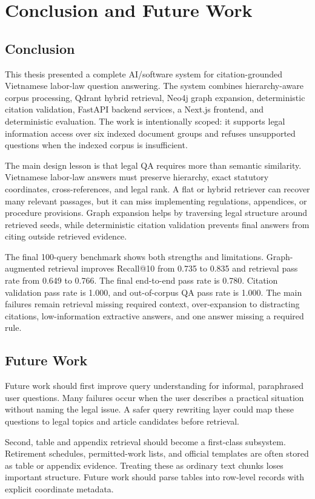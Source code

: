 \section{Conclusion and Future Work}

\subsection{Conclusion}
This thesis presented a complete AI/software system for citation-grounded Vietnamese labor-law question answering. The system combines hierarchy-aware corpus processing, Qdrant hybrid retrieval, Neo4j graph expansion, deterministic citation validation, FastAPI backend services, a Next.js frontend, and deterministic evaluation. The work is intentionally scoped: it supports legal information access over six indexed document groups and refuses unsupported questions when the indexed corpus is insufficient.

The main design lesson is that legal QA requires more than semantic similarity. Vietnamese labor-law answers must preserve hierarchy, exact statutory coordinates, cross-references, and legal rank. A flat or hybrid retriever can recover many relevant passages, but it can miss implementing regulations, appendices, or procedure provisions. Graph expansion helps by traversing legal structure around retrieved seeds, while deterministic citation validation prevents final answers from citing outside retrieved evidence.

The final 100-query benchmark shows both strengths and limitations. Graph-augmented retrieval improves Recall@10 from 0.735 to 0.835 and retrieval pass rate from 0.649 to 0.766. The final end-to-end pass rate is 0.780. Citation validation pass rate is 1.000, and out-of-corpus QA pass rate is 1.000. The main failures remain retrieval missing required context, over-expansion to distracting citations, low-information extractive answers, and one answer missing a required rule.

\subsection{Future Work}
Future work should first improve query understanding for informal, paraphrased user questions. Many failures occur when the user describes a practical situation without naming the legal issue. A safer query rewriting layer could map these questions to legal topics and article candidates before retrieval.

Second, table and appendix retrieval should become a first-class subsystem. Retirement schedules, permitted-work lists, and official templates are often stored as table or appendix evidence. Treating these as ordinary text chunks loses important structure. Future work should parse tables into row-level records with explicit coordinate metadata.

